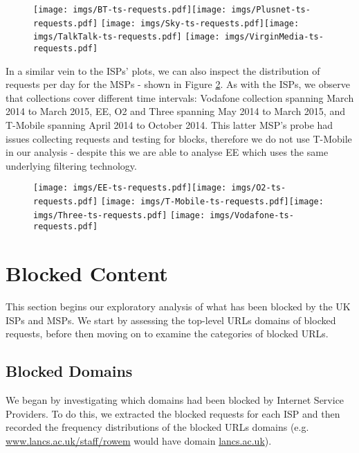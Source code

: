 \documentclass{bmcart}
\begin{document}
\begin{figure}[h!]
\caption{}
\texttt{[image: imgs/BT-ts-requests.pdf]}\texttt{[image: imgs/Plusnet-ts-requests.pdf]}
\texttt{[image: imgs/Sky-ts-requests.pdf]}\texttt{[image: imgs/TalkTalk-ts-requests.pdf]}
\texttt{[image: imgs/VirginMedia-ts-requests.pdf]}
\label{fig:broadband-requests}
\end{figure}

In a similar vein to the ISPs' plots, we can also inspect the distribution of requests per day for the MSPs - shown in Figure \ref{fig:mobile-requests}.
As with the ISPs, we observe that collections cover different time intervals: Vodafone collection spanning March 2014 to March 2015, EE, O2 and Three spanning May 2014 to March 2015, and T-Mobile spanning April 2014 to October 2014.
This latter MSP's probe had issues collecting requests and testing for blocks, therefore we do not use T-Mobile in our analysis - despite this we are able to analyse EE which uses the same underlying filtering technology.

\begin{figure}[h!]
\caption{}
\texttt{[image: imgs/EE-ts-requests.pdf]}\texttt{[image: imgs/O2-ts-requests.pdf]}
\texttt{[image: imgs/T-Mobile-ts-requests.pdf]}\texttt{[image: imgs/Three-ts-requests.pdf]}
\texttt{[image: imgs/Vodafone-ts-requests.pdf]}
\label{fig:mobile-requests}
\end{figure}



\section*{Blocked Content}
This section begins our exploratory analysis of what has been blocked by the UK ISPs and MSPs.
We start by assessing the top-level URLs domains of blocked requests, before then moving on to examine the categories of blocked URLs.

\subsection*{Blocked Domains}
We began by investigating which domains had been blocked by Internet Service Providers.
To do this, we extracted the blocked requests for each ISP and then recorded the frequency distributions of the blocked URLs domains (e.g. \url{www.lancs.ac.uk/staff/rowem} would have domain \url{lancs.ac.uk}).
\end{document}
